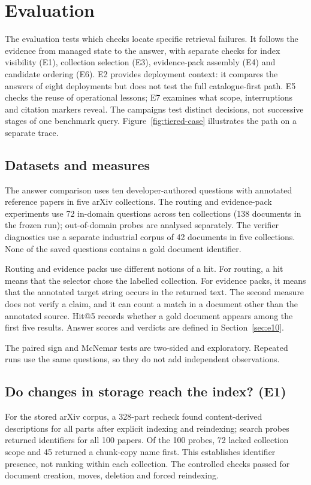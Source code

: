 \section{Evaluation}
\label{sec:eval}
The evaluation tests which checks locate specific retrieval failures.
It follows the evidence from managed state to the answer, with separate
checks for index visibility (E1), collection selection (E3), evidence-pack
assembly (E4) and candidate ordering (E6). E2 provides deployment context:
it compares the answers of eight deployments but does not test
the full catalogue-first path. E5 checks the reuse of operational lessons;
E7 examines what scope, interruptions and citation markers reveal. The
campaigns test distinct decisions, not successive stages of one benchmark
query. Figure~\ref{fig:tiered-case} illustrates the path on a separate trace.

\subsection{Datasets and measures}\label{sec:eval-setup}
The answer comparison uses ten developer-authored questions with annotated
reference papers in five arXiv collections. The routing and evidence-pack
experiments use 72 in-domain questions across ten collections (138 documents
in the frozen run); out-of-domain probes are analysed separately. The
verifier diagnostics use a separate industrial corpus of 42 documents in
five collections. None of the saved questions contains a gold document
identifier.

Routing and evidence packs use different notions of a hit. For routing, a
hit means that the selector chose the labelled collection. For evidence
packs, it means that the annotated target string occurs in the returned text.
The second measure does not verify a claim, and it can count a match in a
document other than the annotated source. Hit@5 records whether a gold
document appears among the first five results. Answer scores and verdicts
are defined in Section~\ref{sec:e10}.

The paired sign and McNemar tests are two-sided and exploratory. Repeated
runs use the same questions, so they do not add independent observations.

\subsection{Do changes in storage reach the index? (E1)}
\label{sec:e1}
\label{sec:e2}
\label{sec:exp-e1}
For the stored arXiv corpus, a 328-part recheck found content-derived
descriptions for all parts after explicit indexing and reindexing; search
probes returned identifiers for all 100 papers. Of the 100
probes, 72 lacked collection scope and 45 returned a chunk-copy name first.
This establishes identifier presence, not ranking within each collection. The controlled
checks passed for document creation, moves, deletion and forced reindexing.

